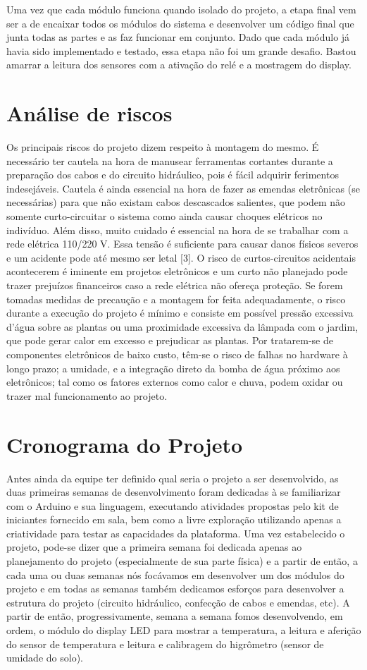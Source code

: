 \documentclass[a4paper,12pt]{article}
\begin{document}
    Uma vez que cada módulo funciona quando isolado do projeto, a etapa final vem ser a de encaixar todos os módulos do sistema e desenvolver um código final que junta todas as partes e as faz funcionar em conjunto. Dado que cada módulo já havia sido implementado e testado, essa etapa não foi um grande desafio. Bastou amarrar a leitura dos sensores com a ativação do relé e a mostragem do display.


\section{Análise de riscos}
Os principais riscos do projeto dizem respeito à montagem do mesmo. É necessário ter cautela na hora de manusear ferramentas cortantes durante a preparação dos cabos e do circuito hidráulico, pois é fácil adquirir ferimentos indesejáveis. Cautela é ainda essencial na hora de fazer as emendas eletrônicas (se necessárias) para que não existam cabos descascados salientes, que podem não somente curto-circuitar o sistema como ainda causar choques elétricos no indivíduo. Além disso, muito cuidado é essencial na hora de se trabalhar com a rede elétrica 110/220 V. Essa tensão é suficiente para causar danos físicos severos e um acidente pode até mesmo ser letal [3]. O risco de curtos-circuitos acidentais acontecerem é iminente em projetos eletrônicos e um curto não planejado pode trazer prejuízos financeiros caso a rede elétrica não ofereça proteção.
    Se forem tomadas medidas de precaução e a montagem for feita adequadamente, o risco durante a execução do projeto é mínimo e consiste em possível pressão excessiva d’água sobre as plantas ou uma proximidade excessiva da lâmpada com o jardim, que pode gerar calor em excesso e prejudicar as plantas.
    Por tratarem-se de componentes eletrônicos de baixo custo, têm-se o risco de falhas no hardware à longo prazo; a umidade, e a integração direto da bomba de água próximo aos eletrônicos; tal como os fatores externos como calor e chuva, podem oxidar ou trazer mal funcionamento ao projeto.  


\section{Cronograma do Projeto}
Antes ainda da equipe ter definido qual seria o projeto a ser desenvolvido, as duas primeiras semanas de desenvolvimento foram dedicadas à se familiarizar com o Arduino e sua linguagem, executando atividades propostas pelo kit de iniciantes fornecido em sala, bem como a livre exploração utilizando apenas a criatividade para testar as capacidades da plataforma. Uma vez estabelecido o projeto, pode-se dizer que a primeira semana foi dedicada apenas ao planejamento do projeto (especialmente de sua parte física) e a partir de então, a cada uma ou duas semanas nós focávamos em desenvolver um dos módulos do projeto e em todas as semanas também dedicamos esforços para desenvolver a estrutura do projeto (circuito hidráulico, confecção de cabos e emendas, etc). A partir de então, progressivamente, semana a semana fomos desenvolvendo, em ordem, o módulo do display LED para mostrar a temperatura, a leitura e aferição do sensor de temperatura e leitura e calibragem do higrômetro (sensor de umidade do solo).
\end{document}
